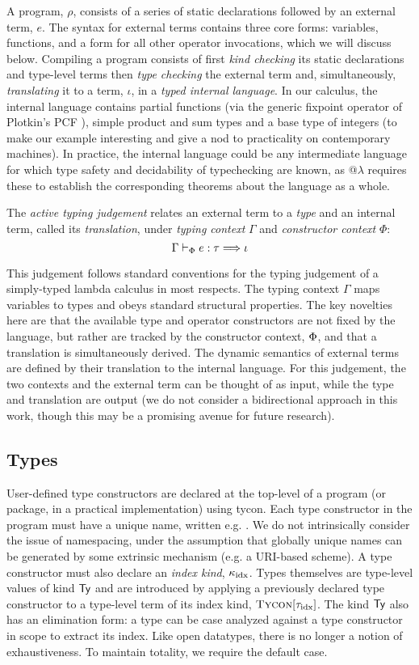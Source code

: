 \documentclass[9pt,preprint]{sigplanconf}
\begin{document}
A program, $\rho$, consists of a series of static declarations followed by an external term, $e$. The syntax for external terms contains three core forms: variables, functions, and a form for all other operator invocations, which we will discuss below. Compiling a program consists of first \emph{kind checking} its static declarations and type-level terms then \emph{type checking} the external term and, simultaneously, \emph{translating} it to a term, $\iota$, in a \emph{typed internal language}. In our calculus, the internal language contains partial functions (via the generic fixpoint operator of Plotkin's PCF \cite{PCF}), simple product and sum types and a base type of integers (to make our example interesting and give a nod to practicality on contemporary machines). In practice, the internal language could be any intermediate language for which type safety and decidability of typechecking are known, as @$\lambda$ requires these to establish the corresponding theorems about the language as a whole.

The \emph{active typing judgement} relates an external term to a \emph{type} and an internal term, called its \emph{translation}, under \emph{typing context} $\Gamma$ and \emph{constructor context} $\Phi$: 
$$\Gamma \vdash_{\Phi} e : \tau \Longrightarrow \iota$$ 

This judgement follows standard conventions for the typing judgement of a simply-typed lambda calculus in most respects. The typing context $\Gamma$ maps variables to types and obeys standard structural properties. The key novelties here are that the available type and operator constructors are not fixed by the language, but rather are tracked by the constructor context, $\Phi$, and that a translation is simultaneously derived. The dynamic semantics of external terms are defined by their translation to the internal language. For this judgement, the two contexts and the external term can be thought of as input, while the type and translation are output (we do not consider a bidirectional approach in this work, though this may be a promising avenue for future research).

\subsection{Types}
User-defined type constructors are declared at the top-level of a program (or package, in a practical implementation) using \textsf{tycon}. Each type constructor in the program must have a unique name, written e.g. . We do not intrinsically consider the issue of namespacing, under the assumption that globally unique names can be generated by some extrinsic mechanism (e.g. a URI-based scheme). A type constructor must also declare an \emph{index kind}, $\kappa_{\text{idx}}$. Types themselves are type-level values of kind $\textsf{Ty}$ and are introduced by applying a previously declared type constructor to a type-level term of its index kind, $\textsc{Tycon}[{\tau_{\text{idx}}}]$. The kind $\textsf{Ty}$ also has an elimination form: a type can be case analyzed against a type constructor in scope to extract its index. Like open datatypes, there is no longer a notion of exhaustiveness. To maintain totality, we require the default case.
\end{document}
